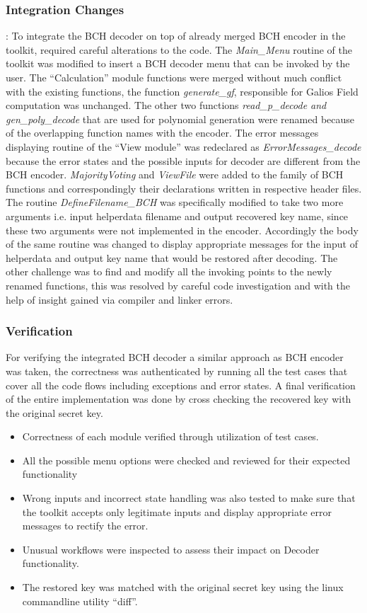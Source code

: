 \subsubsection{Integration Changes}: To integrate the BCH decoder on top of already merged BCH encoder in the toolkit, required careful alterations to the code. The \emph{Main\_Menu} routine of the toolkit was modified to insert a BCH decoder menu that can be invoked by the user. The ``Calculation'' module functions were merged without much conflict with the existing functions, the function \emph{generate\_gf}, responsible for Galios Field computation was unchanged. The other two functions
\emph{read\_p\_decode and gen\_poly\_decode} that are used for polynomial generation were renamed because of the overlapping function names with the encoder. The error messages displaying routine of the ``View module'' was redeclared as  \emph{ErrorMessages\_decode} because the error states and the possible inputs for decoder are different from the BCH encoder. \emph{MajorityVoting} and \emph{ViewFile} were added to the family of BCH functions and correspondingly their declarations written in respective header files. The
routine \emph{DefineFilename\_BCH} was specifically modified to take two more arguments i.e. input helperdata filename and output recovered key name, since these two arguments were not implemented in the encoder. Accordingly the body of the same routine was changed to display appropriate messages for the input of helperdata and output key name that would be restored after decoding. The other challenge was to find and modify all the invoking points to the newly renamed functions, this was
resolved by careful code investigation and with the help of insight gained via compiler and linker errors.\\

\subsubsection{Verification}
For verifying the integrated BCH decoder a similar approach as BCH encoder was taken, the correctness was authenticated by running all the test cases that cover all the code flows including exceptions and error states. A final verification of the entire implementation was done by cross checking the recovered key with the original secret key.


\begin{itemize}
	\item Correctness of each module verified through utilization of test cases.
	\item All the possible menu options were checked and reviewed for their expected functionality
	\item Wrong inputs and incorrect state handling was also tested to make sure that the toolkit accepts only legitimate inputs and display appropriate error messages to rectify the error.
	\item Unusual workflows were inspected to assess their impact on Decoder functionality.
	\item The restored key was matched with the original secret key using the linux commandline utility ``diff''.
\end{itemize}

